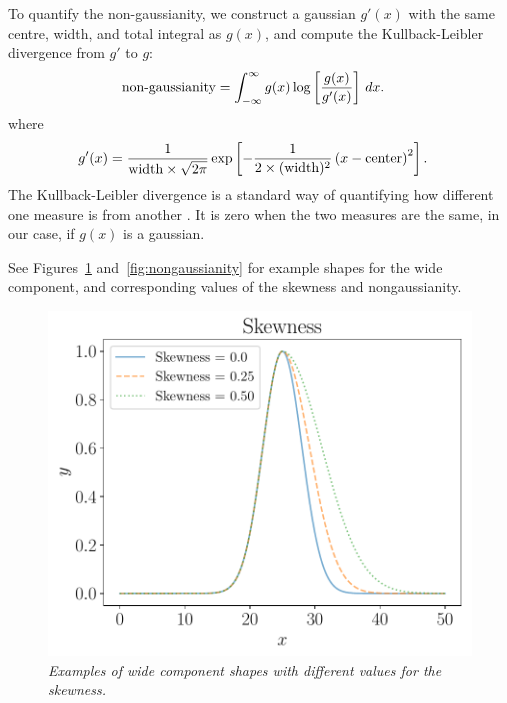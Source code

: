 \documentclass[a4paper, 12pt]{article}
\newcommand{\x}{x}
\begin{document}
To quantify the non-gaussianity, we construct a gaussian
$g'(\x)$
with the same centre, width, and total integral as $g(\x)$, and compute the
Kullback-Leibler divergence from $g'$ to $g$:
\begin{align}
\textnormal{non-gaussianity} &= 
    \int_{-\infty}^\infty g(\x) \log\left[\frac{g(\x)}{g'(\x)}\right] \, d\x.
\end{align}
where
\begin{align}
g'(\x) &= \frac{1}{\textnormal{width} \times \sqrt{2\pi}}
            \exp\left[-\frac{1}{2\times (\textnormal{width})^2}
                    \left(\x - \textnormal{center}\right)^2\right].
\end{align}
The Kullback-Leibler divergence is a standard way of quantifying how
different one measure is from another \citep{knuth2012foundations}.
It is zero when the two measures are the same, in our case,
if $g(\x)$ is a gaussian.

See Figures~\ref{fig:skewness} and~\ref{fig:nongaussianity} for example
shapes for the wide component, and corresponding values of the skewness
and nongaussianity.

\begin{figure}[!ht]
\centering
\includegraphics[scale=0.7]{figures/skewness.pdf}
\caption{\it Examples of wide component shapes with different values
for the skewness.\label{fig:skewness}}
\end{figure}
\end{document}
